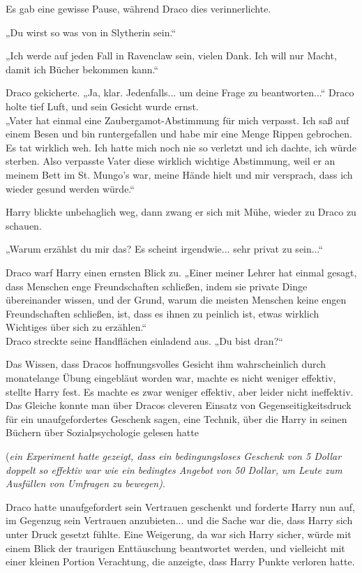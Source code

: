 {Es gab eine gewisse Pause, während Draco dies verinnerlichte.

„Du wirst so was von in Slytherin sein.“

„Ich werde auf jeden Fall in Ravenclaw sein, vielen Dank. Ich will nur Macht, damit ich Bücher bekommen kann.“

Draco gekicherte. „Ja, klar. Jedenfalls... um deine Frage zu beantworten...“ Draco holte tief Luft, und sein Gesicht wurde ernst.\\ „Vater hat einmal eine Zaubergamot-Abstimmung für mich verpasst. Ich saß auf einem Besen und bin runtergefallen und habe mir eine Menge Rippen gebrochen. Es tat wirklich weh. Ich hatte mich noch nie so verletzt und ich dachte, ich würde sterben. Also verpasste Vater diese wirklich wichtige Abstimmung, weil er an meinem Bett im St. Mungo's war, meine Hände hielt und mir versprach, dass ich wieder gesund werden würde.“

Harry blickte unbehaglich weg, dann zwang er sich mit Mühe, wieder zu Draco zu schauen.

„Warum erzählst du mir das? Es scheint irgendwie... sehr privat zu sein...“

Draco warf Harry einen ernsten Blick zu. „Einer meiner Lehrer hat einmal gesagt, dass Menschen enge Freundschaften schließen, indem sie private Dinge übereinander wissen, und der Grund, warum die meisten Menschen keine engen Freundschaften schließen, ist, dass es ihnen zu peinlich ist, etwas wirklich Wichtiges über sich zu erzählen.“\\ Draco streckte seine Handflächen einladend aus. „Du bist dran?“

Das Wissen, dass Dracos hoffnungsvolles Gesicht ihm wahrscheinlich durch monatelange Übung eingebläut worden war, machte es nicht weniger effektiv, stellte Harry fest. Es machte es zwar weniger effektiv, aber leider nicht ineffektiv. Das Gleiche konnte man über Dracos cleveren Einsatz von Gegenseitigkeitsdruck für ein unaufgefordertes Geschenk sagen, eine Technik, über die Harry in seinen Büchern über Sozialpsychologie gelesen hatte

(\emph{ein Experiment hatte gezeigt, dass ein bedingungsloses Geschenk von 5 Dollar doppelt so effektiv war wie ein bedingtes Angebot von 50 Dollar, um Leute zum Ausfüllen von Umfragen zu bewegen)}.

Draco hatte unaufgefordert sein Vertrauen geschenkt und forderte Harry nun auf, im Gegenzug sein Vertrauen anzubieten... und die Sache war die, dass Harry sich unter Druck gesetzt fühlte. Eine Weigerung, da war sich Harry sicher, würde mit einem Blick der traurigen Enttäuschung beantwortet werden, und vielleicht mit einer kleinen Portion Verachtung, die anzeigte, dass Harry Punkte verloren hatte.

}
